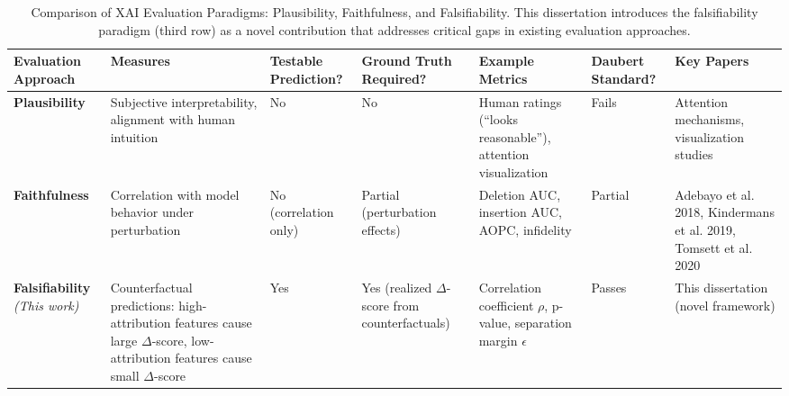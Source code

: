 
\begin{table}[htbp]
\centering
\small
\caption{Comparison of XAI Evaluation Paradigms: Plausibility, Faithfulness, and Falsifiability. This dissertation introduces the falsifiability paradigm (third row) as a novel contribution that addresses critical gaps in existing evaluation approaches.}
\label{tab:evaluation_paradigms}
\begin{tabular}{p{2.2cm}p{2.8cm}p{1.3cm}p{1.8cm}p{3cm}p{1.4cm}p{2.2cm}}
\toprule
\textbf{Evaluation Approach} & \textbf{Measures} & \textbf{Testable Prediction?} & \textbf{Ground Truth Required?} & \textbf{Example Metrics} & \textbf{Daubert Standard?} & \textbf{Key Papers} \\
\midrule
\textbf{Plausibility}
& Subjective interpretability, alignment with human intuition
& No
& No
& Human ratings (``looks reasonable''), attention visualization
& Fails
& Attention mechanisms, visualization studies \\
\midrule
\textbf{Faithfulness}
& Correlation with model behavior under perturbation
& No (correlation only)
& Partial (perturbation effects)
& Deletion AUC, insertion AUC, AOPC, infidelity
& Partial
& Adebayo et al. 2018, Kindermans et al. 2019, Tomsett et al. 2020 \\
\midrule
\textbf{Falsifiability} \newline \textit{(This work)}
& Counterfactual predictions: high-attribution features cause large $\Delta$-score, low-attribution features cause small $\Delta$-score
& Yes
& Yes (realized $\Delta$-score from counterfactuals)
& Correlation coefficient $\rho$, p-value, separation margin $\epsilon$
& Passes
& This dissertation (novel framework) \\
\bottomrule
\end{tabular}
\end{table}

